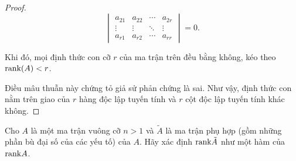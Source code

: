\documentclass[class=linearalgebra,crop=false]{standalone}
\begin{document}
\begin{proof}
\[\begin{vmatrix}
            a_{21} & a_{22} & \cdots & a_{2r} \\
            \vdots & \vdots & \ddots & \vdots \\
            a_{r1} & a_{r2} & \cdots & a_{rr}
        \end{vmatrix} = 0.
    \]
    \par Khi đó, mọi định thức con cỡ $r$ của ma trận trên đều bằng không, kéo theo $\text{rank}(A) < r$.
    \par Điều mâu thuẫn này chứng tỏ giả sử phản chứng là sai. Như vậy, định thức con nằm trên giao của $r$ hàng độc lập tuyến tính và $r$ cột độc lập tuyến tính khác không.
\end{proof}

\begin{exercise}
    \par Cho $A$ là một ma trận vuông cỡ $n > 1$ và $\tilde{A}$ là ma trận phụ hợp (gồm những phần bù đại số của các yếu tố) của $A$. Hãy xác định $\text{rank}\tilde{A}$ như một hàm của $\text{rank} A$.
\end{exercise}
\end{document}
